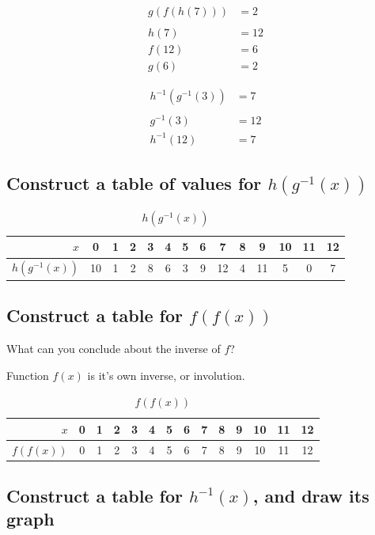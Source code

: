 \documentclass[12pt,a4paper]{article}
\begin{document}
\begin{align*}
g(f(h(7))) &= 2 \\
\\
h(7) &= 12 \\
f(12) &= 6 \\
g(6) &= 2
\end{align*}

\begin{align*}
h^{-1}(g^{-1}(3)) &= 7 \\
\\
g^{-1}(3) &= 12 \\
h^{-1}(12) &= 7
\end{align*}

\subsection{Construct a table of values for $h(g^{-1}(x))$}

\begin{table}[!h]
\centering
\caption{$h(g^{-1}(x))$}
\begin{tabular}{r|c|c|c|c|c|c|c|c|c|c|c|c|c}
$x$ & 0 & 1 & 2 & 3 & 4 & 5 & 6 & 7 & 8 & 9 & 10 & 11 & 12 \\
\hline
$h(g^{-1}(x))$ & 10 & 1 & 2 & 8 & 6 & 3 & 9 & 12 & 4 & 11 & 5 & 0 & 7
\end{tabular}
\end{table}

\newpage
\subsection{Construct a table for $f(f(x))$}

What can you conclude about the inverse of $f$?

Function $f(x)$ is it's own inverse, or involution.

\begin{table}[!h]
\centering
\caption{$f(f(x))$}
\begin{tabular}{r|c|c|c|c|c|c|c|c|c|c|c|c|c}
$x$ & 0 & 1 & 2 & 3 & 4 & 5 & 6 & 7 & 8 & 9 & 10 & 11 & 12 \\
\hline
$f(f(x))$ & 0 & 1 & 2 & 3 & 4 & 5 & 6 & 7 & 8 & 9 & 10 & 11 & 12
\end{tabular}
\end{table}

\subsection{Construct a table for $h^{-1}(x)$, and draw its graph}
\end{document}
